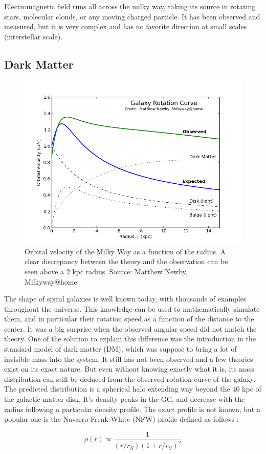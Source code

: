 Electromagnetic field runs all across the milky way, taking its source in rotating stars, molecular clouds, or any moving charged particle. It has been observed and measured, but it is very complex and has no favorite direction at small scales (interstellar scale).

\subsection{Dark Matter}

\begin{figure}[h]
 \centering
 \includegraphics[width=.5\linewidth]{pic/theory/gal_rotation_curve.png}
 \caption{Orbital velocity of the Milky Way as a function of the radius. A clear discrepancy between the theory and the observation can be seen above a 2 kpc radius. Source: Matthew Newby, Milkyway@home}
 \label{fig:gal_rotation_curve}
\end{figure}


The shape of spiral galaxies is well known today, with thousands of examples throughout the universe. This knowledge can be used to mathematically simulate them, and in particular their rotation speed as a function of the distance to the center. It was a big surprise when the observed angular speed did not match the theory. One of the solution to explain this difference was the introduction in the standard model of dark matter (DM), which was suppose to bring a lot of invisible mass into the system. It still has not been observed and a few theories exist on its exact nature. But even without knowing exactly what it is, its mass distribution can still be deduced from the observed rotation curve of the galaxy. The predicted distribution is a spherical halo extending way beyond the 40 kpc of the galactic matter disk. It's density peaks in the GC, and decrease with the radius following a particular density profile. The exact profile is not known, but a popular one is the Navarro-Frenk-White (NFW) profile defined as follows :

\begin{equation}
\rho (r) \propto \frac{1}{\left( r/r_S \right) \left( 1 + r/r_S \right)^2 }
\end{equation}

